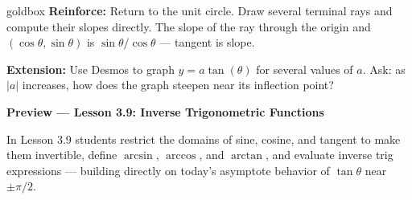 \documentclass[10pt]{article}
\begin{document}
\begin{skillbox}{goldbox}
  \textbf{Reinforce:} Return to the unit circle. Draw several terminal
  rays and compute their slopes directly.  The slope of the ray through the
  origin and $(\cos\theta,\sin\theta)$ is $\sin\theta/\cos\theta$ --- tangent
  is slope.

  \medskip
  \textbf{Extension:} Use Desmos to graph $y=a\tan(\theta)$ for several
  values of $a$. Ask: as $|a|$ increases, how does the graph steepen near
  its inflection point?

  \medskip
  \textbf{Preview --- Lesson 3.9: Inverse Trigonometric Functions}

  In Lesson 3.9 students restrict the domains of sine, cosine, and tangent
  to make them invertible, define $\arcsin$, $\arccos$, and $\arctan$, and
  evaluate inverse trig expressions --- building directly on today's
  asymptote behavior of $\tan\theta$ near $\pm\pi/2$.
\end{skillbox}
\end{document}
